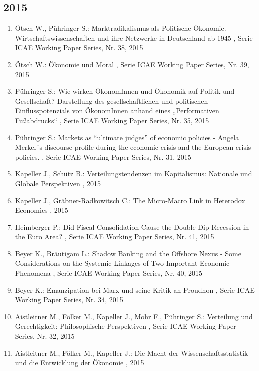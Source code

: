  \subsection*{2015} 
 \begin{enumerate}[leftmargin=*, labelsep=0.5cm] 
	 \item Ötsch W., Pühringer S.:  Marktradikalismus als Politische Ökonomie. Wirtschaftswissenschaften und ihre Netzwerke in Deutschland ab 1945  , Serie ICAE Working Paper Series, Nr. 38, 2015
	 \item Ötsch W.:  Ökonomie und Moral  , Serie ICAE Working Paper Series, Nr. 39, 2015
	 \item Pühringer S.:  Wie wirken ÖkonomInnen und Ökonomik auf Politik und Gesellschaft? Darstellung des gesellschaftlichen und politischen Einflusspotenzials von ÖkonomInnen anhand eines „Performativen Fußabdrucks“  , Serie ICAE Working Paper Series, Nr. 35, 2015
	 \item Pühringer S.:  Markets as “ultimate judges” of economic policies - Angela Merkel´s discourse profile during the economic crisis and the European crisis policies.  , Serie ICAE Working Paper Series, Nr. 31, 2015
	 \item Kapeller J., Schütz B.:  Verteilungstendenzen im Kapitalismus: Nationale und Globale Perspektiven  , 2015
	 \item Kapeller J., Gräbner-Radkowitsch C.:  The Micro‐Macro Link in Heterodox Economics  , 2015
	 \item Heimberger P.:  Did Fiscal Consolidation Cause the Double-Dip Recession in the Euro Area?  , Serie ICAE Working Paper Series, Nr. 41, 2015
	 \item Beyer K., Bräutigam L.:  Shadow Banking and the Offshore Nexus - Some Considerations on the Systemic Linkages of Two Important Economic Phenomena  , Serie ICAE Working Paper Series, Nr. 40, 2015
	 \item Beyer K.:  Emanzipation bei Marx und seine Kritik an Proudhon  , Serie ICAE Working Paper Series, Nr. 34, 2015
	 \item Aistleitner M., Fölker M., Kapeller J., Mohr F., Pühringer S.:  Verteilung und Gerechtigkeit: Philosophische Perspektiven  , Serie ICAE Working Paper Series, Nr. 32, 2015
	 \item Aistleitner M., Fölker M., Kapeller J.:  Die Macht der Wissenschaftsstatistik und die Entwicklung der Ökonomie  , 2015
\end{enumerate} 
